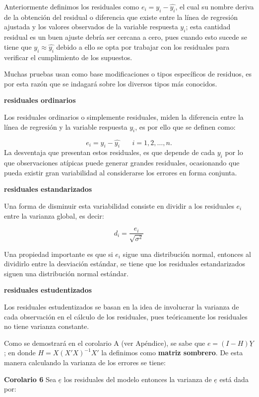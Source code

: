 \documentclass[a4paper,oneside,openany]{book}
\begin{document}
Anteriormente definimos los residuales como \(e_{i}=y_{i}-\hat{y_{i}}\),
el cual su nombre deriva de la obtención del residual o diferencia que
existe entre la línea de regresión ajustada y los valores observados de
la variable respuesta \(y_{i}\); esta cantidad residual es un buen
ajuste debría ser cercana a cero, pues cuando esto sucede se tiene que
\(y_{i} \approx \hat{y_{i}}\) debido a ello se opta por trabajar con los
residuales para verificar el cumplimiento de los supuestos.

Muchas pruebas usan como base modificaciones o tipos específicos de
residuos, es por esta razón que se indagará sobre los diversos tipos más
conocidos.

\textbf{residuales ordinarios}

Los residuales ordinarios o simplemente residuales, miden la diferencia
entre la línea de regresión y la variable respuesta \(y_{i}\), es por
ello que se definen como:

\[e_{i}=y_{i}-\hat{y_{i}}  \ \ \ \ \ \ \ \ i=1,2,\ldots ,n.\] La
desventaja que presentan estos residuales, es que depende de cada
\(y_{i}\) por lo que observaciones atípicas puede generar grandes
residuales, ocasionando que pueda existir gran variabilidad al
considerarse los errores en forma conjunta.

\textbf{residuales estandarizados}

Una forma de disminuir esta variabilidad consiste en dividir a los
residuales \(e_{i}\) entre la varianza global, es decir:

\[d_{i}=\frac{e_{i}}{\sqrt{\sigma^2}}\]

Una propiedad importante es que si \(e_{i}\) sigue una distribución
normal, entonces al dividirlo entre la desviación estándar, se tiene que
los residuales estandarizados siguen una distribución normal estándar.

\textbf{residuales estudentizados}

Los residuales estudentizados se basan en la idea de involucrar la
varianza de cada observación en el cálculo de los residuales, pues
teóricamente los residuales no tiene varianza constante.

Como se demostrará en el corolario A (ver Apéndice), se sabe que
\(e=(I-H)\underline{Y}\); en donde \(H=X(X'X)^{-1}X'\) la definimos como
\textbf{matriz sombrero}. De esta manera calculando la varianza de los
errores se tiene:

\textbf{Corolario 6} Sea \(\underline{e}\) los residuales del modelo
entonces la varianza de \(\underline{e}\) está dada por:
\end{document}
